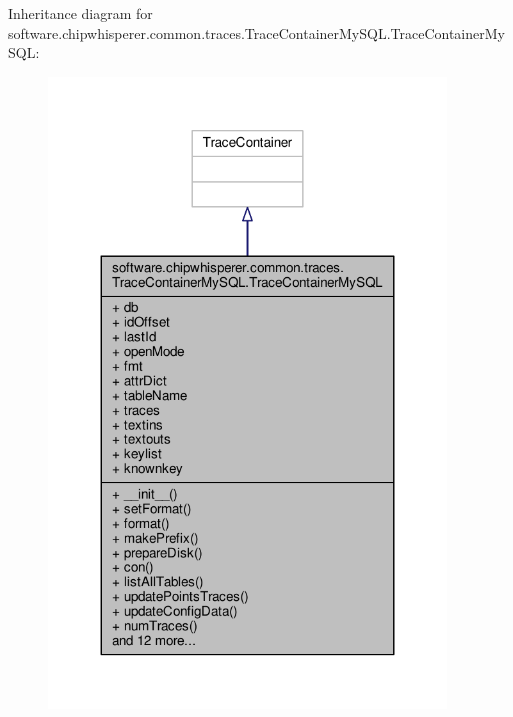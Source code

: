 Inheritance diagram for software.\+chipwhisperer.\+common.\+traces.\+Trace\+Container\+My\+S\+Q\+L.\+Trace\+Container\+My\+S\+Q\+L\+:\nopagebreak
\begin{figure}[H]
\begin{center}
\leavevmode
\includegraphics[width=299pt]{dd/de3/classsoftware_1_1chipwhisperer_1_1common_1_1traces_1_1TraceContainerMySQL_1_1TraceContainerMySQL__inherit__graph}
\end{center}
\end{figure}


